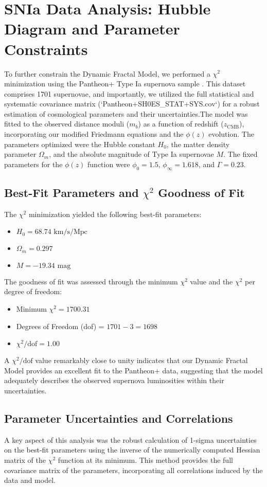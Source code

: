 \documentclass[aps,prl,twocolumn,groupedaddress]{revtex4-2}
\begin{document}

\section{SNIa Data Analysis: Hubble Diagram and Parameter Constraints}
\label{sec:snia_analysis}
To further constrain the Dynamic Fractal Model, we performed a $\chi^2$ minimization using the Pantheon+ Type Ia supernova sample \cite{pantheon_plus_data}. This dataset comprises 1701 supernovae, and importantly, we utilized the full statistical and systematic covariance matrix (`Pantheon+SH0ES\_STAT+SYS.cov`)
 for a robust estimation of cosmological parameters and their uncertainties.The model was fitted to the observed distance moduli ($m_b$) as a function of redshift ($z_{\text{CMB}}$), incorporating our modified Friedmann equations and the $\phi(z)$ evolution. The parameters optimized were the Hubble constant $H_0$, the matter density parameter $\Omega_m$, and the absolute magnitude of Type Ia supernovae $M$. The fixed parameters for the $\phi(z)$ function were $\phi_0 = 1.5$, $\phi_{\infty} = 1.618$, and $\Gamma = 0.23$.

\subsection{Best-Fit Parameters and $\chi^2$ Goodness of Fit}
The $\chi^2$ minimization yielded the following best-fit parameters:
\begin{itemize}
    \item $H_0 = 68.74 \text{ km/s/Mpc}$
    \item $\Omega_m = 0.297$
    \item $M = -19.34 \text{ mag}$
\end{itemize}
The goodness of fit was assessed through the minimum $\chi^2$ value and the $\chi^2$ per degree of freedom:
\begin{itemize}
    \item Minimum $\chi^2 = 1700.31$
    \item Degrees of Freedom (dof) = $1701 - 3 = 1698$
    \item $\chi^2/\text{dof} = 1.00$
\end{itemize}
A $\chi^2/\text{dof}$ value remarkably close to unity indicates that our Dynamic Fractal Model provides an excellent fit to the Pantheon+ data, suggesting that the model adequately describes the observed supernova luminosities within their uncertainties.

\subsection{Parameter Uncertainties and Correlations}
A key aspect of this analysis was the robust calculation of 1-sigma uncertainties on the best-fit parameters using the inverse of the numerically computed Hessian matrix of the $\chi^2$ function at its minimum. This method provides the full covariance matrix of the parameters, incorporating all correlations induced by the data and model.
\end{document}
